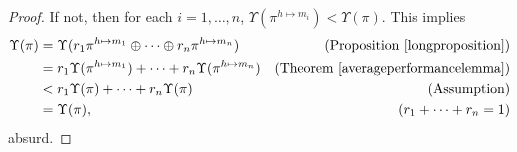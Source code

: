 \documentclass[runningheads]{llncs}
\begin{document}
\begin{proof}
    If not, then for each $i=1,\ldots,n$, $\Upsilon(\pi^{h\mapsto m_i})<\Upsilon(\pi)$.
    This implies
    \begin{align*}
        \Upsilon(\pi)
            &= \Upsilon(r_1\pi^{h\mapsto m_1}\oplus\cdots\oplus r_n\pi^{h\mapsto m_n})
                &\mbox{(Proposition \ref{longproposition})}\\
            &= r_1\Upsilon(\pi^{h\mapsto m_1})+\cdots+r_n\Upsilon(\pi^{h\mapsto m_n})
                &\mbox{(Theorem \ref{averageperformancelemma})}\\
            &< r_1\Upsilon(\pi)+\cdots+r_n\Upsilon(\pi)
                &\mbox{(Assumption)}\\
            &= \Upsilon(\pi),
                &\mbox{($r_1+\cdots+r_n=1$)}
    \end{align*}
    absurd.
\end{proof}



\end{document}
